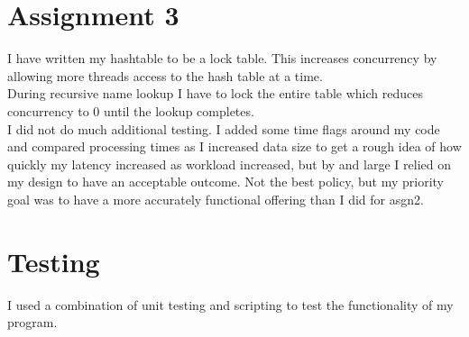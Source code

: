 \documentclass[11pt,letterpaper]{article}
\begin{document}
\section*{Assignment 3}
	I have written my hashtable to be a lock table. This increases concurrency by allowing more threads access to the hash table at a time.\\
	During recursive name lookup I have to lock the entire table which reduces concurrency to 0 until the lookup completes.\\
	I did not do much additional testing. I added some time flags around my code and compared processing times as I increased data size to get
	a rough idea of how quickly my latency increased as workload increased, but by and large I relied on my design to have an acceptable outcome.
	Not the best policy, but my priority goal was to have a more accurately functional offering than I did for asgn2.
	
\section*{Testing}
I used a combination of unit testing and scripting to test the functionality of my program.
\end{document}
